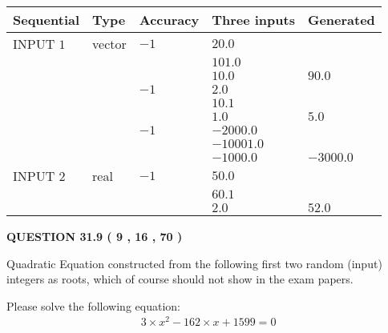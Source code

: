 \documentclass[12pt]{article}
\begin{document}
  
\noindent\begin{tabular}{|l|l|l|l|l|}
\hline
 Sequential & Type & Accuracy & Three inputs & Generated \\ 
\hline
 
 
  INPUT $            1 $ & vector & $           -1  $ & $
20.0
  $ & \\
  & & & $
101.0
  $ & \\
  & & & $
10.0
$ & $ 90.0 $ 
  \\
  & & $           -1  $ & $
2.0
  $ & \\
  & & & $
10.1
  $ & \\
  & & & $
1.0
$ & $ 5.0 $ 
  \\
  & & $           -1  $ & $
-2000.0
  $ & \\
  & & & $
-10001.0
  $ & \\
  & & & $
-1000.0
$ & $ -3000.0 $ 
 \\  \hline  
 
 
  INPUT $            2 $ & real & $           -1  $ & $
 50.0
  $ & \\
  & & &  $
 60.1
  $ & \\
  & & &  $
 2.0
 $ & $ 52.0 $ 
 \\  \hline  
 \end{tabular}
   
   
  
\vspace{0.2in}
  
{\textbf{\Large{QUESTION
31.9 
 (           9 ,          16 ,          70 )
}}}
  
  


\noindent{}
Quadratic Equation constructed from the following first two random (input) integers as roots,  
which of course should not show in the exam papers.  
\noindent{}


 
 

 
Please solve the following equation:
\begin{eqnarray*}
3 \times x^2  %
-162
                 \times x    %
+  %
1599 =0
\end{eqnarray*}
 
 
 
\noindent{}
 
\end{document}
